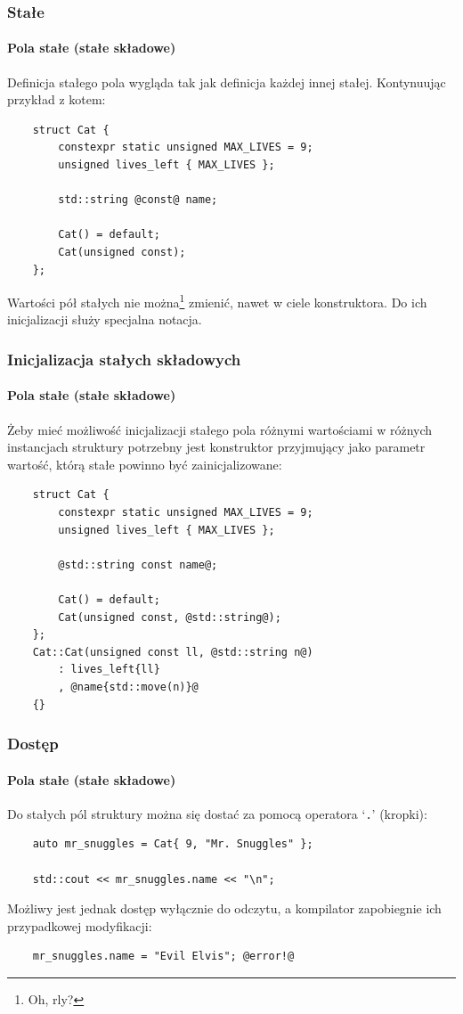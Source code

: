 \documentclass[aspectratio=169]{beamer}
\begin{document}
\begin{frame}[fragile]
    \frametitle{Stałe}
    \framesubtitle{Pola stałe (stałe składowe)}

    Definicja stałego pola wygląda tak jak definicja każdej innej stałej.
    Kontynuując przykład z kotem:

    {\scriptsize
    \begin{lstlisting}
    struct Cat {
        constexpr static unsigned MAX_LIVES = 9;
        unsigned lives_left { MAX_LIVES };

        std::string @const@ name;

        Cat() = default;
        Cat(unsigned const);
    };
    \end{lstlisting}}

    Wartości pół stałych nie można\footnote{Oh,
    rly?\label{hackerman_const_field_mutation}} zmienić, nawet w ciele
    konstruktora. Do ich inicjalizacji służy specjalna notacja.
\end{frame}

\begin{frame}[fragile]
    \frametitle{Inicjalizacja stałych składowych}
    \framesubtitle{Pola stałe (stałe składowe)}

    Żeby mieć możliwość inicjalizacji stałego pola różnymi wartościami w różnych
    instancjach struktury potrzebny jest konstruktor przyjmujący jako parametr
    wartość, którą stałe powinno być zainicjalizowane:

    {\scriptsize
    \begin{lstlisting}
    struct Cat {
        constexpr static unsigned MAX_LIVES = 9;
        unsigned lives_left { MAX_LIVES };

        @std::string const name@;

        Cat() = default;
        Cat(unsigned const, @std::string@);
    };
    Cat::Cat(unsigned const ll, @std::string n@)
        : lives_left{ll}
        , @name{std::move(n)}@
    {}
    \end{lstlisting}}
\end{frame}

\begin{frame}[fragile]
    \frametitle{Dostęp}
    \framesubtitle{Pola stałe (stałe składowe)}

    Do stałych pól struktury można się dostać za pomocą operatora `{\tt .}'
    (kropki):

    {\small
    \begin{lstlisting}
    auto mr_snuggles = Cat{ 9, "Mr. Snuggles" };

    std::cout << mr_snuggles.name << "\n";
    \end{lstlisting}}

    Możliwy jest jednak dostęp wyłącznie do odczytu, a kompilator zapobiegnie
    ich przypadkowej modyfikacji:

    {\small
    \begin{lstlisting}
    mr_snuggles.name = "Evil Elvis"; @error!@
    \end{lstlisting}}
\end{frame}
\end{document}
